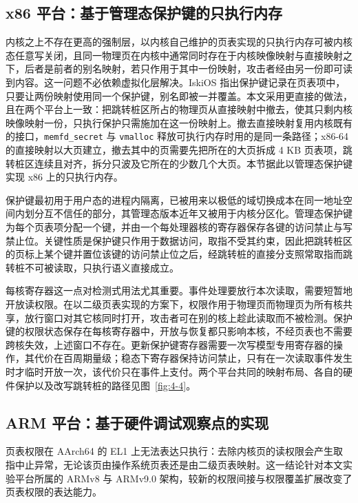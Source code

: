 \subsection{x86 平台：基于管理态保护键的只执行内存}

内核之上不存在更高的强制层，以内核自己维护的页表实现的只执行内存可被内核态任意写关闭，且同一物理页在内核中通常同时存在于内核映像映射与直接映射之下，后者是前者的别名映射，若只作用于其中一份映射，攻击者经由另一份即可读到内容。这一问题不必依赖虚拟化层解决。IskiOS\citep{gravani2021iskios} 指出保护键记录在页表项中，只要让两份映射使用同一个保护键，别名即被一并覆盖。本文采用更直接的做法，且在两个平台上一致：把跳转桩区所占的物理页从直接映射中撤去，使其只剩内核映像映射一份，只执行保护只需施加在这一份映射上。撤去直接映射复用内核既有的接口，\lstinline[breaklines=false]@memfd_secret@ 与 \lstinline[breaklines=false]@vmalloc@ 释放可执行内存时用的是同一条路径；x86-64 的直接映射以大页建立，撤去其中的页需要先把所在的大页拆成 4 KB 页表项，跳转桩区连续且对齐，拆分只波及它所在的少数几个大页。本节据此以管理态保护键实现 x86 上的只执行内存。

保护键最初用于用户态的进程内隔离，已被用来以极低的域切换成本在同一地址空间内划分互不信任的部分\citep{vahldiek2019erim,hedayati2019hodor}，其管理态版本近年又被用于内核分区化\citep{guo2025bulkhead,huang2022ksplit}。管理态保护键为每个页表项分配一个键，并由一个每处理器核的寄存器保存各键的访问禁止与写禁止位。关键性质是保护键只作用于数据访问，取指不受其约束，因此把跳转桩区的页标上某个键并置位该键的访问禁止位之后，经跳转桩的直接分支照常取指而跳转桩不可被读取，只执行语义直接成立。

每核寄存器这一点对检测式用法尤其重要。事件处理要放行本次读取，需要短暂地开放读权限。在以二级页表实现的方案下，权限作用于物理页而物理页为所有核共享，放行窗口对其它核同时打开，攻击者可在别的核上趁此读取而不被检测。保护键的权限状态保存在每核寄存器中，开放与恢复都只影响本核，不经页表也不需要跨核失效，上述窗口不存在。更新保护键寄存器需要一次写模型专用寄存器的操作，其代价在百周期量级；稳态下寄存器保持访问禁止，只有在一次读取事件发生时才临时开放一次，该代价只在事件上支付。两个平台共同的映射布局、各自的硬件保护以及改写跳转桩的路径见图~\ref{fig:4-4}。

\subsection{ARM 平台：基于硬件调试观察点的实现}

页表权限在 AArch64 的 EL1 上无法表达只执行：去除内核页的读权限会产生取指中止异常，无论该页由操作系统页表还是由二级页表映射。这一结论针对本文实验平台所属的 ARMv8 与 ARMv9.0 架构，较新的权限间接与权限覆盖扩展改变了页表权限的表达能力。

